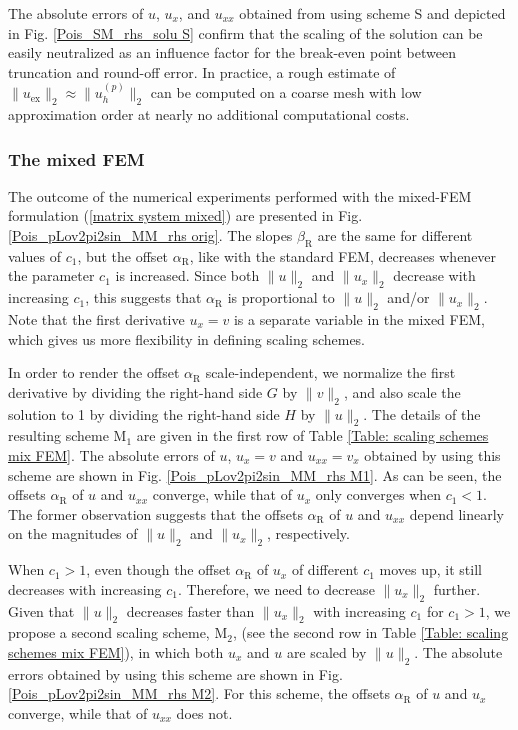 \documentclass[final,3p]{elsarticle}
\begin{document}
The absolute errors of $u$, $u_x$, and $u_{xx}$ obtained from using scheme S and depicted in Fig. \ref{Pois_SM_rhs_solu S} confirm that the scaling of the solution can be easily neutralized as an influence factor for the break-even point between truncation and round-off error. In practice, a rough estimate of $\|u_{\text{ex}}\|_{2}\approx \|u_{h}^{(p)}\|_{2}$ can be computed on a coarse mesh with low approximation order at nearly no additional computational costs.

\subsubsection{The mixed FEM}			\label{scaling_mix_FEM}

The outcome of the numerical experiments performed with the mixed-FEM formulation (\ref{matrix system mixed}) are presented in Fig. \ref{Pois_pLov2pi2sin_MM_rhs orig}. The slopes $\beta _{\text{R}}$ are the same for different values of $c_1$, but the offset $\alpha_{\text{R}}$, like with the standard FEM, decreases whenever the parameter $c_1$ is increased.
Since both $\|u\|_{2}$ and $\|u_{x}\|_{2}$ decrease with increasing $c_1$, this suggests that $\alpha_{\text{R}}$ is proportional to $\|u\|_{2}$ and/or $\|u_{x}\|_{2}$. Note that the first derivative $u_x=v$ is a separate variable in the mixed FEM, which gives us more flexibility in defining scaling schemes.

In order to render the offset $\alpha_{\text{R}}$ scale-independent, we normalize the first derivative by dividing the right-hand side $G$ by ${\|v\|_{2}}$, and also scale the solution to 1 by dividing the right-hand side $H$ by ${\|u\|_{2}}$. The details of the resulting scheme $\text{M}_1$ are given in the first row of Table \ref{Table: scaling schemes mix FEM}.
The absolute errors of $u$, $u_{x}=v$ and $u_{xx}=v_x$ obtained by using this scheme are shown in Fig. \ref{Pois_pLov2pi2sin_MM_rhs M1}.
As can be seen, the offsets $\alpha_{\text{R}}$ of $u$ and $u_{xx}$ converge, while that of $u_{x}$ only converges when $c_1<1$. 
The former observation suggests that the offsets $\alpha_{\text{R}}$ of $u$ and $u_{xx}$ depend linearly on the magnitudes of $\|u\|_{2}$ and $\|u_{x}\|_{2}$, respectively.

When $c_1>1$, even though the offset $\alpha_{\text{R}}$ of $u_x$ of different $c_1$ moves up, it still decreases with increasing $c_1$.
Therefore, we need to decrease ${\|u_x\|_{2}}$ further.
Given that ${\|u\|_{2}}$ decreases faster than ${\|u_x\|_{2}}$ with increasing $c_1$ for $c_1>1$, we propose a second scaling scheme, $\text{M}_2$, (see the second row in Table \ref{Table: scaling schemes mix FEM}), in which both $u_x$ and $u$ are scaled by $\|u\|_{2}$. The absolute errors obtained by using this scheme are shown in Fig. \ref{Pois_pLov2pi2sin_MM_rhs M2}. For this scheme, the offsets $\alpha_{\text{R}}$ of $u$ and $u_{x}$ converge, while that of $u_{xx}$ does not.
\end{document}
